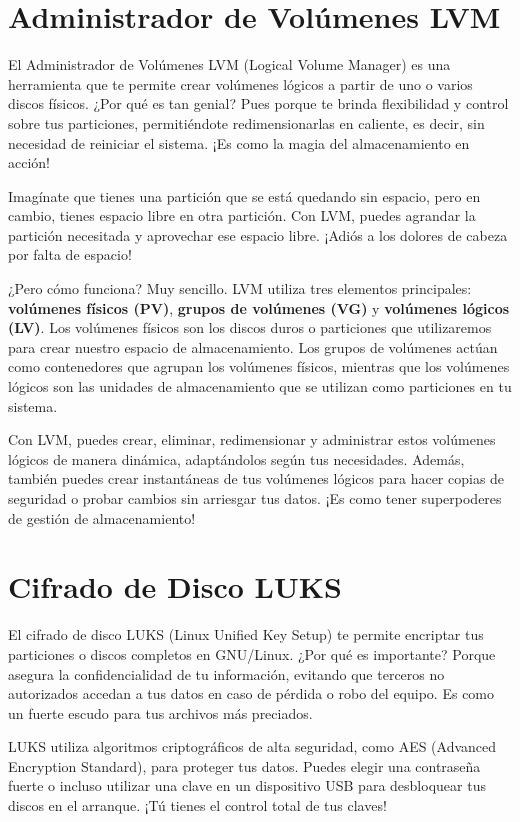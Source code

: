 \documentclass[
  jou,
  floatsintext,
  longtable,
  a4paper,
  nolmodern,
  notxfonts,
  notimes,
  colorlinks=true,linkcolor=blue,citecolor=blue,urlcolor=blue]{apa7}
\begin{document}
\section{Administrador de Volúmenes
LVM}\label{administrador-de-voluxfamenes-lvm}

El Administrador de Volúmenes LVM (Logical Volume Manager) es una
herramienta que te permite crear volúmenes lógicos a partir de uno o
varios discos físicos. ¿Por qué es tan genial? Pues porque te brinda
flexibilidad y control sobre tus particiones, permitiéndote
redimensionarlas en caliente, es decir, sin necesidad de reiniciar el
sistema. ¡Es como la magia del almacenamiento en acción!

Imagínate que tienes una partición que se está quedando sin espacio,
pero en cambio, tienes espacio libre en otra partición. Con LVM, puedes
agrandar la partición necesitada y aprovechar ese espacio libre. ¡Adiós
a los dolores de cabeza por falta de espacio!

¿Pero cómo funciona? Muy sencillo. LVM utiliza tres elementos
principales: \textbf{volúmenes físicos (PV)}, \textbf{grupos de
volúmenes (VG)} y \textbf{volúmenes lógicos (LV)}. Los volúmenes físicos
son los discos duros o particiones que utilizaremos para crear nuestro
espacio de almacenamiento. Los grupos de volúmenes actúan como
contenedores que agrupan los volúmenes físicos, mientras que los
volúmenes lógicos son las unidades de almacenamiento que se utilizan
como particiones en tu sistema.

Con LVM, puedes crear, eliminar, redimensionar y administrar estos
volúmenes lógicos de manera dinámica, adaptándolos según tus
necesidades. Además, también puedes crear instantáneas de tus volúmenes
lógicos para hacer copias de seguridad o probar cambios sin arriesgar
tus datos. ¡Es como tener superpoderes de gestión de almacenamiento!

\section{Cifrado de Disco LUKS}\label{cifrado-de-disco-luks}

El cifrado de disco LUKS (Linux Unified Key Setup) te permite encriptar
tus particiones o discos completos en GNU/Linux. ¿Por qué es importante?
Porque asegura la confidencialidad de tu información, evitando que
terceros no autorizados accedan a tus datos en caso de pérdida o robo
del equipo. Es como un fuerte escudo para tus archivos más preciados.

LUKS utiliza algoritmos criptográficos de alta seguridad, como AES
(Advanced Encryption Standard), para proteger tus datos. Puedes elegir
una contraseña fuerte o incluso utilizar una clave en un dispositivo USB
para desbloquear tus discos en el arranque. ¡Tú tienes el control total
de tus claves!
\end{document}
